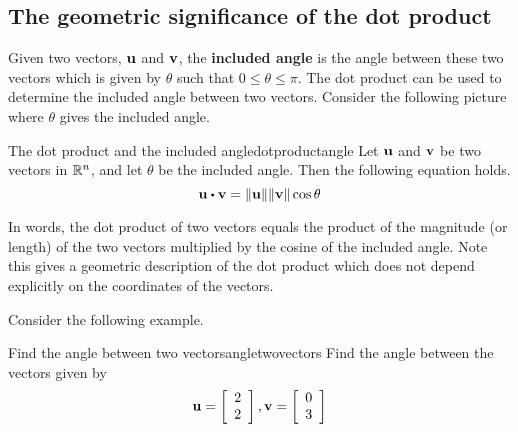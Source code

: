 \subsection{The geometric significance of the dot product}

Given two vectors, ${\bf u}$ and ${\bf v}$, the \textbf{included angle}
  is the angle between these two vectors which
is given by $\theta$ such that $0 \leq \theta \leq \pi$. The dot product can be used to
determine the included angle between two vectors. Consider the following picture where $\theta$ gives the included angle. 

\begin{center}
\end{center}

\begin{proposition}{The dot product and the included angle}{dotproductangle}
Let ${\bf u}$ and ${\bf v}$ be two vectors in $\mathbb{R}^n$, and let 
$\theta$ be the included angle. Then the following equation holds.
\begin{equation*}
\vect{u}\dotprod \vect{v}=\vectlength \vect{u}\vectlength \vectlength \vect{v}
\vectlength \cos \theta 
\end{equation*}
\end{proposition}

In words, the dot product of two vectors equals the product of
the magnitude (or length) of the two vectors multiplied by the cosine of the included
angle. Note this gives a geometric description of the dot product which does
not depend explicitly on the coordinates of the vectors.

Consider the following example.

\begin{example}{Find the angle between two vectors}{angletwovectors}
Find the angle between the vectors given by 
\begin{equation*}
{\bf u}
=
\left[
\begin{array}{r}
2 \\
2
\end{array}
\right], 
{\bf v}
=
\left[
\begin{array}{r}
0 \\
3 
\end{array}
\right]
\end{equation*}
\end{example}


